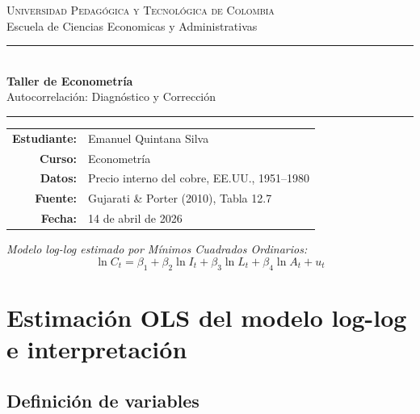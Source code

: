 \documentclass[12pt,a4paper]{article}
\begin{document}
\begin{titlepage}
  \centering
  \vspace*{2cm}
  {\Large \textsc{Universidad Pedagógica y Tecnológica de Colombia}\\[0.3cm]
   \large Escuela de Ciencias Economicas y Administrativas}\par
  \vspace{2cm}
  \rule{\linewidth}{0.6pt}\\[0.4cm]
  {\LARGE \bfseries Taller de Econometría}\\[0.3cm]
  {\large Autocorrelación: Diagnóstico y Corrección}\\[0.1cm]
  \rule{\linewidth}{0.6pt}
  \vspace{1.5cm}

  \begin{tabular}{rl}
    \textbf{Estudiante:} & Emanuel Quintana Silva \\[0.4em]
    \textbf{Curso:}      & Econometría \\[0.4em]
    \textbf{Datos:}      & Precio interno del cobre, EE.UU., 1951--1980 \\[0.4em]
    \textbf{Fuente:}     & Gujarati \& Porter (2010), Tabla 12.7 \\[0.4em]
    \textbf{Fecha:}      & 14 de abril de 2026
  \end{tabular}

  \vspace{2cm}
  \textit{Modelo log-log estimado por Mínimos Cuadrados Ordinarios:}\\[0.6em]
  \[
    \ln C_t = \beta_1 + \beta_2\ln I_t + \beta_3\ln L_t + \beta_4\ln A_t + u_t
  \]

  \vfill
\end{titlepage}

\tableofcontents
\newpage

\section{Estimación OLS del modelo log-log e interpretación}
\label{sec:A}

\subsection{Definición de variables}
\end{document}
